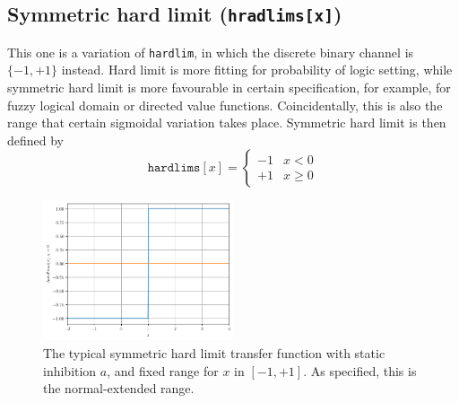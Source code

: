 \subsection{Symmetric hard limit (\texttt{hradlims[x]})}
This one is a variation of \texttt{hardlim}, in which the discrete binary channel is $\{-1,+1\}$ instead. Hard limit is more fitting for probability of logic setting, while symmetric hard limit is more favourable in certain specification, for example, for fuzzy logical domain or directed value functions. Coincidentally, this is also the range that certain sigmoidal variation takes place. Symmetric hard limit is then defined by
\begin{equation}
    \texttt{hardlims}[x] = \begin{cases}
        -1 & x < 0\\
        +1 & x \geq 0 
    \end{cases}
\end{equation}
\begin{figure}[t!]
    \centering
    \includegraphics[width=0.5\textwidth]{img/symhardlim.png}
    \caption{The typical symmetric hard limit transfer function with static inhibition $a$, and fixed range for $x$ in $[-1,+1]$. As specified, this is the normal-extended range.}
\end{figure}
